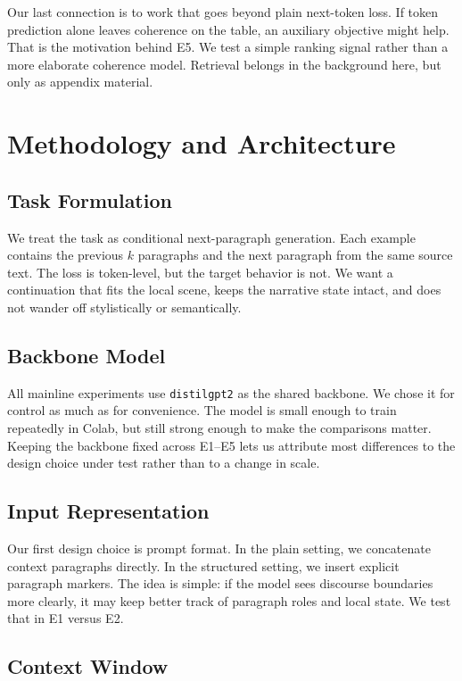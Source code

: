 \documentclass{article}
\newcommand{\model}{\texttt{distilgpt2}}
\newcommand{\expid}[1]{\textsc{#1}}
\begin{document}
Our last connection is to work that goes beyond plain next-token loss. If token prediction alone leaves coherence on the table, an auxiliary objective might help. That is the motivation behind \expid{E5}. We test a simple ranking signal rather than a more elaborate coherence model. Retrieval belongs in the background here, but only as appendix material.

\section{Methodology and Architecture}

\subsection{Task Formulation}

We treat the task as conditional next-paragraph generation. Each example contains the previous $k$ paragraphs and the next paragraph from the same source text. The loss is token-level, but the target behavior is not. We want a continuation that fits the local scene, keeps the narrative state intact, and does not wander off stylistically or semantically.

\subsection{Backbone Model}

All mainline experiments use \model{} as the shared backbone. We chose it for control as much as for convenience. The model is small enough to train repeatedly in Colab, but still strong enough to make the comparisons matter. Keeping the backbone fixed across \expid{E1}--\expid{E5} lets us attribute most differences to the design choice under test rather than to a change in scale.

\subsection{Input Representation}

Our first design choice is prompt format. In the plain setting, we concatenate context paragraphs directly. In the structured setting, we insert explicit paragraph markers. The idea is simple: if the model sees discourse boundaries more clearly, it may keep better track of paragraph roles and local state. We test that in \expid{E1} versus \expid{E2}.

\subsection{Context Window}
\end{document}
